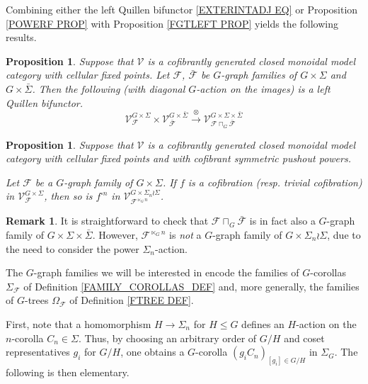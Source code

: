 \documentclass[a4paper,10pt
,draft
]{article}%
\numberwithin{equation}{section}
\numberwithin{figure}{section}
\newtheorem{proposition}[equation]{Proposition}%
\theoremstyle{definition} %
\newtheorem{remark}[equation]{Remark}%
\newcommand{\1}{\ensuremath{\mathbbm 1}}%
\begin{document}
Combining either the left Quillen bifunctor \eqref{EXTERINTADJ EQ} or 
Proposition \ref{POWERF PROP}
with Proposition \ref{FGTLEFT PROP} yields the following results.


\begin{proposition}\label{EXTERINTADJG PROP}
Suppose that $\mathcal{V}$ is a cofibrantly generated closed monoidal model category with cellular fixed points.
Let $\mathcal{F}$, $\bar{\mathcal{F}}$ be $G$-graph families of 
$G \times \Sigma$ and $G \times \bar{\Sigma}$. Then the following (with diagonal $G$-action on the images) 
is a left Quillen bifunctor.
\[
	\mathcal{V}^{G \times \Sigma}_{\mathcal{F}}
		\times
	\mathcal{V}^{G \times \bar{\Sigma}}_{\bar{\mathcal{F}}}
		\xrightarrow{\otimes}
		\mathcal{V}^{G \times \Sigma \times \bar{\Sigma}}_{
	\mathcal{F} \sqcap_G \bar{\mathcal{F}}}
\]
\end{proposition}


\begin{proposition}\label{POWERFG PROP}
        Suppose that $\mathcal{V}$ is a cofibrantly generated closed monoidal model category with cellular fixed points and with cofibrant symmetric pushout powers.
	
	Let $\mathcal{F}$ be a $G$-graph family of $G \times \Sigma$. If $f$ is a cofibration (resp. trivial cofibration) in
	$\mathcal{V}^{G \times \Sigma}_{\mathcal{F}}$,
	then so is $f^{\square n}$
        in 
	$\mathcal{V}^{G \times \Sigma_n \wr \Sigma}_{\mathcal{F}^{\ltimes_{G} n}}$.
\end{proposition}


\begin{remark}
        It is straightforward to check that 
        $\mathcal{F} \sqcap_G \bar{\mathcal{F}}$
	is in fact also a $G$-graph family of $G \times \Sigma \times \bar{\Sigma}$.
	However, $\mathcal{F}^{\ltimes_G n}$ is \textit{not}
	a $G$-graph family of $G \times \Sigma_n \wr \Sigma$,
	due to the need to consider the power $\Sigma_n$-action.
\end{remark}

The $G$-graph families we will be interested in
encode the families of $G$-corollas 
 $\Sigma_{\mathcal{F}}$
of Definition \ref{FAMILY_COROLLAS_DEF} and,
more generally, the families of $G$-trees 
$\Omega_{\mathcal{F}}$ 
of Definition \ref{FTREE DEF}. 

First, note that a
homomorphism
$H \to \Sigma_n$ for $H \leq G$
defines an $H$-action on the $n$-corolla $C_n \in \Sigma$.
Thus, by choosing an arbitrary order of 
$G/H$ and coset representatives $g_i$ for $G/H$,
one obtains a $G$-corolla
$(g_i C_n)_{[g_i] \in G/H}$ in $\Sigma_G$.
The following is then elementary.
\end{document}
